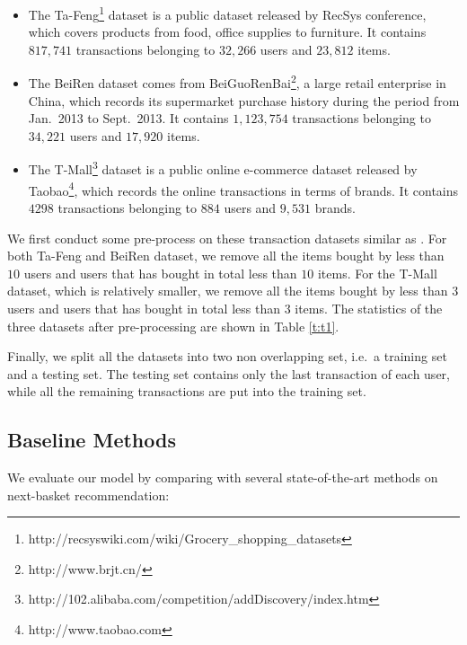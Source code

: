 \documentclass[10pt,journal,compsoc]{IEEEtran}
\begin{document}
\begin{itemize}
\item The Ta-Feng\footnote{http://recsyswiki.com/wiki/Grocery\_shopping\_datasets} dataset is a public dataset released by RecSys conference, which covers products from food, office supplies to furniture. It contains $817,741$ transactions belonging to $32,266$ users and $23,812$ items.
\item The BeiRen dataset comes from BeiGuoRenBai\footnote{http://www.brjt.cn/}, a large retail enterprise in China, which records its supermarket purchase history during the period from Jan.~2013 to Sept.~2013. It contains $1,123,754$ transactions belonging to $34,221$ users and $17,920$ items.
\item The T-Mall\footnote{http://102.alibaba.com/competition/addDiscovery/index.htm} dataset is a public online e-commerce dataset released by Taobao\footnote{http://www.taobao.com}, which records the online transactions in terms of brands. It contains $4298$ transactions belonging to $884$ users and $9,531$ brands.
\end{itemize}

We first conduct some pre-process on these transaction datasets similar as \cite{fpmc}. For both Ta-Feng and BeiRen dataset, we remove all the items bought by less than $10$ users and users that has bought in total less than $10$ items. For the T-Mall dataset, which is relatively smaller, we remove all the items bought by less than $3$ users and users that has bought in total less than $3$ items. The statistics of the three datasets after pre-processing are shown in Table \ref{t:t1}.

Finally, we split all the datasets into two non overlapping set, i.e.~a training set and a testing set. The testing set contains only the last transaction of each user, while all the remaining transactions are put into the training set.

\subsection{Baseline Methods}
We evaluate our model by comparing with several state-of-the-art methods on next-basket recommendation:
\end{document}
